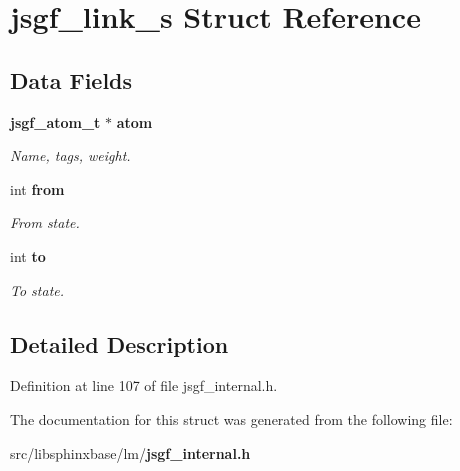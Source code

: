 \section{jsgf\-\_\-link\-\_\-s \-Struct \-Reference}
\label{structjsgf__link__s}
\subsection*{\-Data \-Fields}
\begin{DoxyCompactItemize}
\item 
{\bf jsgf\-\_\-atom\-\_\-t} $\ast$ {\bf atom}\label{structjsgf__link__s_a140a7cfbe76100928b9c7ea052435ca5}

\begin{DoxyCompactList}\small\item\em \-Name, tags, weight. \end{DoxyCompactList}\item 
int {\bf from}\label{structjsgf__link__s_a02f9b2bc3b98e802164e80d051923bb3}

\begin{DoxyCompactList}\small\item\em \-From state. \end{DoxyCompactList}\item 
int {\bf to}\label{structjsgf__link__s_a9da8ad9d87149f0cfca6ca815c581717}

\begin{DoxyCompactList}\small\item\em \-To state. \end{DoxyCompactList}\end{DoxyCompactItemize}


\subsection{\-Detailed \-Description}


\-Definition at line 107 of file jsgf\-\_\-internal.\-h.



\-The documentation for this struct was generated from the following file\-:\begin{DoxyCompactItemize}
\item 
src/libsphinxbase/lm/{\bf jsgf\-\_\-internal.\-h}\end{DoxyCompactItemize}
